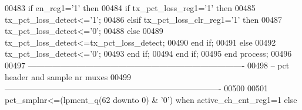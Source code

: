 \begin{DoxyCode}
00483           \textcolor{keywordflow}{if} \textcolor{vhdlchar}{en_reg1}\textcolor{vhdlchar}{=}\textcolor{vhdlchar}{'}\textcolor{vhdllogic}{}\textcolor{vhdllogic}{1}\textcolor{vhdlchar}{'} \textcolor{keywordflow}{then}
00484             \textcolor{keywordflow}{if} \textcolor{vhdlchar}{tx_pct_loss_reg1}\textcolor{vhdlchar}{=}\textcolor{vhdlchar}{'}\textcolor{vhdllogic}{}\textcolor{vhdllogic}{1}\textcolor{vhdlchar}{'} \textcolor{keywordflow}{then} 
00485               \textcolor{vhdlchar}{tx_pct_loss_detect}\textcolor{vhdlchar}{<=}\textcolor{vhdlchar}{'}\textcolor{vhdllogic}{}\textcolor{vhdllogic}{1}\textcolor{vhdlchar}{'};
00486             \textcolor{keywordflow}{elsif}  \textcolor{vhdlchar}{tx_pct_loss_clr_reg1}\textcolor{vhdlchar}{=}\textcolor{vhdlchar}{'}\textcolor{vhdllogic}{}\textcolor{vhdllogic}{1}\textcolor{vhdlchar}{'} \textcolor{keywordflow}{then} 
00487               \textcolor{vhdlchar}{tx_pct_loss_detect}\textcolor{vhdlchar}{<=}\textcolor{vhdlchar}{'}\textcolor{vhdllogic}{}\textcolor{vhdllogic}{0}\textcolor{vhdlchar}{'};
00488             \textcolor{keywordflow}{else} 
00489               \textcolor{vhdlchar}{tx_pct_loss_detect}\textcolor{vhdlchar}{<=}\textcolor{vhdlchar}{tx_pct_loss_detect};
00490             \textcolor{keywordflow}{end} \textcolor{keywordflow}{if};
00491           \textcolor{keywordflow}{else} 
00492              \textcolor{vhdlchar}{tx_pct_loss_detect}\textcolor{vhdlchar}{<=}\textcolor{vhdlchar}{'}\textcolor{vhdllogic}{}\textcolor{vhdllogic}{0}\textcolor{vhdlchar}{'};
00493           \textcolor{keywordflow}{end} \textcolor{keywordflow}{if};
00494         \textcolor{keywordflow}{end} \textcolor{keywordflow}{if};
00495     \textcolor{keywordflow}{end} \textcolor{keywordflow}{process};  
00496 
00497 \textcolor{keyword}{-------------------------------------------------------------------------------}
00498 \textcolor{keyword}{-- pct header and sample nr muxes}
00499 \textcolor{keyword}{-------------------------------------------------------------------------------}
00500 
00501 \textcolor{vhdlchar}{pct_smplnr}\textcolor{vhdlchar}{<=}\textcolor{vhdlchar}{(}\textcolor{vhdlchar}{lpmcnt_q}\textcolor{vhdlchar}{(}\textcolor{vhdllogic}{}\textcolor{vhdllogic}{62} \textcolor{keywordflow}{downto} \textcolor{vhdllogic}{}\textcolor{vhdllogic}{0}\textcolor{vhdlchar}{)} \textcolor{vhdlchar}{&} \textcolor{vhdlchar}{'}\textcolor{vhdllogic}{}\textcolor{vhdllogic}{0}\textcolor{vhdlchar}{'}\textcolor{vhdlchar}{)}  \textcolor{keywordflow}{when} \textcolor{vhdlchar}{active_ch_cnt_reg1}\textcolor{vhdlchar}{=}\textcolor{vhdllogic}{}\textcolor{vhdllogic}{1} \textcolor{keywordflow}{else}  \textcolor{vhdlchar}{
}
\end{DoxyCode}
